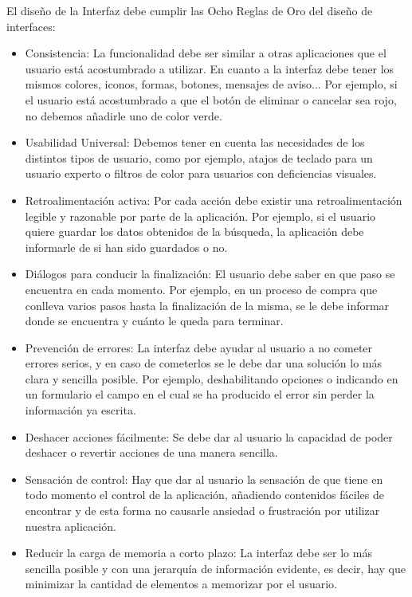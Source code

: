 El diseño de la Interfaz debe cumplir las Ocho Reglas de Oro del diseño de interfaces:
\begin{itemize} 
	\item Consistencia: La funcionalidad debe ser similar a otras aplicaciones que el usuario está acostumbrado a utilizar. En cuanto a la interfaz debe tener los mismos colores, iconos, formas, botones, mensajes de aviso... Por ejemplo, si el usuario está acostumbrado a que el botón de eliminar o cancelar sea rojo, no debemos añadirle uno de color verde.
	\item Usabilidad Universal: Debemos tener en cuenta las necesidades de los distintos tipos de usuario, como por ejemplo, atajos de teclado para un usuario experto o filtros de color para usuarios con deficiencias visuales.
	\item Retroalimentación activa: Por cada acción debe existir una retroalimentación legible y razonable por parte de la aplicación. Por ejemplo, si el usuario quiere guardar los datos obtenidos de la búsqueda, la aplicación debe informarle de si han sido guardados o no.
	\item Diálogos para conducir la finalización: El usuario debe saber en que paso se encuentra en cada momento. Por ejemplo, en un proceso de compra que conlleva varios pasos hasta la finalización de la misma, se le debe informar donde se encuentra y cuánto le queda para terminar.
	\item Prevención de errores: La interfaz debe ayudar al usuario a no cometer errores serios, y en caso de cometerlos se le debe dar una solución lo más clara y sencilla posible. Por ejemplo, deshabilitando opciones o indicando en un formulario el campo en el cual se ha producido el error sin perder la información ya escrita.
	\item Deshacer acciones fácilmente: Se debe dar al usuario la capacidad de poder deshacer o revertir acciones de una manera sencilla. 
	\item Sensación de control: Hay que dar al usuario la sensación de que tiene en todo momento el control de la aplicación, añadiendo contenidos fáciles de encontrar y de esta forma no causarle ansiedad o frustración por utilizar nuestra aplicación.
	\item Reducir la carga de memoria a corto plazo: La interfaz debe ser lo más sencilla posible y con una jerarquía de información evidente, es decir, hay que minimizar la cantidad de elementos a memorizar por el usuario.
\end{itemize}
